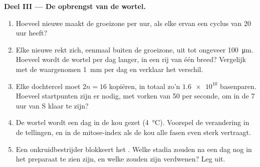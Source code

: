 \begin{problem}
\medskip
\noindent\textbf{Deel III --- De opbrengst van de wortel.}
\begin{enumerate}[resume]
  \item Hoeveel nieuwe  maakt de groeizone per uur, als elke 
        ervan een cyclus van 20 uur heeft?
  \item Elke nieuwe  rekt zich, eenmaal buiten de groeizone, uit tot
        ongeveer \qty{100}{\micro m}. Hoeveel wordt de wortel per dag
        langer, in een rij  van één  breed? Vergelijk met de
        waargenomen \qty{1}{mm} per dag en verklaar het verschil.
  \item Elke dochtercel moet $2n = 16$  kopiëren, in totaal
        zo'n $\num{1.6e10}$ basenparen. Hoeveel startpunten zijn er
        nodig, met vorken van 50  per seconde, om in de 7 uur
        van S klaar te zijn?
  \item De wortel wordt een dag in de kou gezet (\qty{4}{\celsius}).
        Voorspel de verandering in de tellingen, en in de mitose-index
        als de kou alle fasen even sterk vertraagt.
  \item Een onkruidbestrijder blokkeert het . Welke stadia
        zouden na een dag nog in het preparaat te zien zijn, en welke
        zouden zijn verdwenen? Leg uit.
\end{enumerate}


\end{problem}
